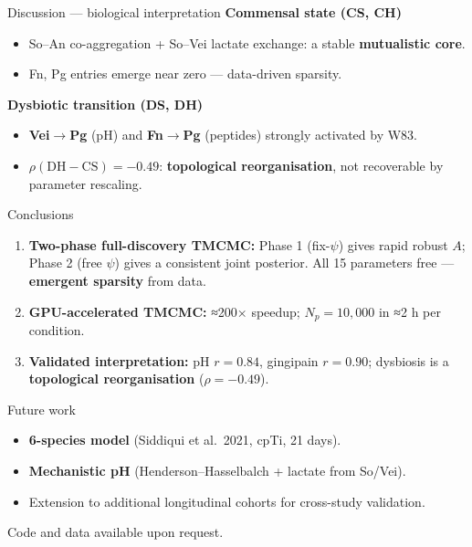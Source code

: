 \documentclass[
  ignorenonframetext,
  aspectratio=169,
  c]{beamer}
\providecommand{\tightlist}{%
  \setlength{\itemsep}{0pt}\setlength{\parskip}{0pt}}
\begin{document}
\begin{frame}{Discussion --- biological interpretation}
\protect\hypertarget{discussion-biological-interpretation}{}
\textbf{Commensal state (CS, CH)}

\begin{itemize}
\tightlist
\item
  So--An co-aggregation + So--Vei lactate exchange: a stable
  \textbf{mutualistic core}.
\item
  Fn, Pg entries emerge near zero --- data-driven sparsity.
\end{itemize}

\textbf{Dysbiotic transition (DS, DH)}

\begin{itemize}
\tightlist
\item
  \textbf{Vei\(\to\)Pg} (pH) and \textbf{Fn\(\to\)Pg} (peptides)
  strongly activated by W83.
\item
  \(\rho(\mathrm{DH}-\mathrm{CS})=-0.49\): \textbf{topological
  reorganisation}, not recoverable by parameter rescaling.
\end{itemize}
\end{frame}

\begin{frame}{Conclusions}
\protect\hypertarget{conclusions}{}
\begin{enumerate}
\tightlist
\item
  \textbf{Two-phase full-discovery TMCMC:} Phase 1 (fix-\(\psi\)) gives
  rapid robust \(A\); Phase 2 (free \(\psi\)) gives a consistent joint
  posterior. All 15 parameters free --- \textbf{emergent sparsity} from
  data.
\item
  \textbf{GPU-accelerated TMCMC:} ≈200× speedup; \(N_p=10{,}000\) in ≈2
  h per condition.
\item
  \textbf{Validated interpretation:} pH \(r=0.84\), gingipain
  \(r=0.90\); dysbiosis is a \textbf{topological reorganisation}
  (\(\rho=-0.49\)).
\end{enumerate}
\end{frame}

\begin{frame}{Future work}
\protect\hypertarget{future-work}{}
\begin{itemize}
\tightlist
\item
  \textbf{6-species model} (Siddiqui et al.~2021, cpTi, 21 days).
\item
  \textbf{Mechanistic pH} (Henderson--Hasselbalch + lactate from
  So/Vei).
\item
  Extension to additional longitudinal cohorts for cross-study
  validation.
\end{itemize}

\vspace{0.4em}

Code and data available upon request.
\end{frame}
\end{document}
